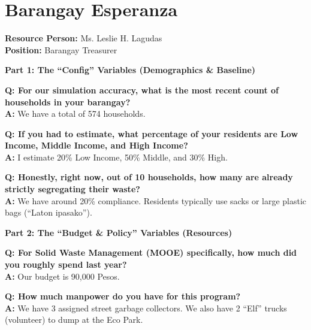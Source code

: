 \section{Barangay Esperanza}
\label{appendix:ezperanza_interview}

\noindent
\textbf{Resource Person:} Ms. Leslie H. Lagudas \\
\textbf{Position:} Barangay Treasurer \\

\vspace{0.5cm}

\noindent \textbf{\large Part 1: The ``Config'' Variables (Demographics \& Baseline)}
\vspace{0.2cm}

\noindent \textbf{Q: For our simulation accuracy, what is the most recent count of households in your barangay?} \\
\textbf{A:} We have a total of 574 households.
\vspace{0.3cm}

\noindent \textbf{Q: If you had to estimate, what percentage of your residents are Low Income, Middle Income, and High Income?} \\
\textbf{A:} I estimate 20\% Low Income, 50\% Middle, and 30\% High.
\vspace{0.3cm}

\noindent \textbf{Q: Honestly, right now, out of 10 households, how many are already strictly segregating their waste?} \\
\textbf{A:} We have around 20\% compliance.
Residents typically use sacks or large plastic bags (``Laton ipasako'').

\vspace{0.5cm}

\noindent \textbf{\large Part 2: The ``Budget \& Policy'' Variables (Resources)}
\vspace{0.2cm}

\noindent \textbf{Q: For Solid Waste Management (MOOE) specifically, how much did you roughly spend last year?} \\
\textbf{A:} Our budget is 90,000 Pesos.
\vspace{0.3cm}

\noindent \textbf{Q: How much manpower do you have for this program?} \\
\textbf{A:} We have 3 assigned street garbage collectors.
We also have 2 ``Elf'' trucks (volunteer) to dump at the Eco Park.

\vspace{0.3cm}

